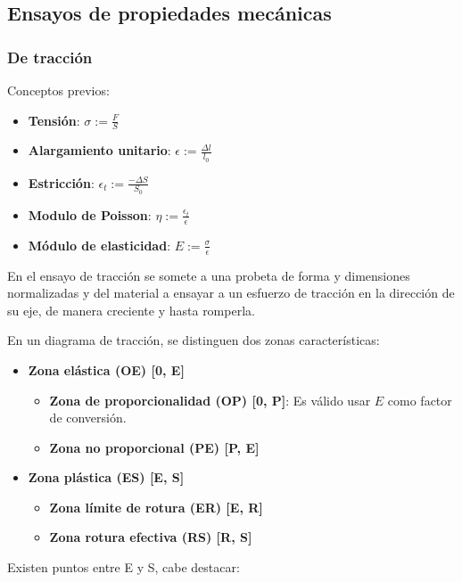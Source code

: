 \documentclass[10pt]{article}
\begin{document}
\subsection{Ensayos de propiedades mecánicas}

\subsubsection{De tracción}

Conceptos previos:

\begin{itemize}
  \item \textbf{Tensión}: $ \sigma := \frac{F}{S} $
  \item \textbf{Alargamiento unitario}: $ \epsilon := \frac{\Delta l}{l_{0}} $
  \item \textbf{Estricción}: $ \epsilon_{t} := \frac{-\Delta S}{S_{0}} $
  \item \textbf{Modulo de Poisson}: $ \eta := \frac{\epsilon_{t}}{\epsilon} $
  \item \textbf{Módulo de elasticidad}: $ E := \frac{\sigma}{\epsilon} $
\end{itemize}

En el ensayo de tracción se somete a una probeta de forma y dimensiones normalizadas y del material a ensayar a un esfuerzo de tracción en la dirección de su eje,
de manera creciente y hasta romperla.

En un diagrama de tracción, se distinguen dos zonas características:

\begin{itemize}
  \item \textbf{Zona elástica (OE) [0, E]}
    \begin{itemize}
      \item \textbf{Zona de proporcionalidad (OP) [0, P]}: Es válido usar $ E $ como factor de conversión.
      \item \textbf{Zona no proporcional (PE) [P, E]}
    \end{itemize}
  \item \textbf{Zona plástica (ES) [E, S]}
    \begin{itemize}
      \item \textbf{Zona límite de rotura (ER) [E, R]}
      \item \textbf{Zona rotura efectiva (RS) [R, S]}
    \end{itemize}
\end{itemize}

Existen puntos entre E y S, cabe destacar:
\end{document}

